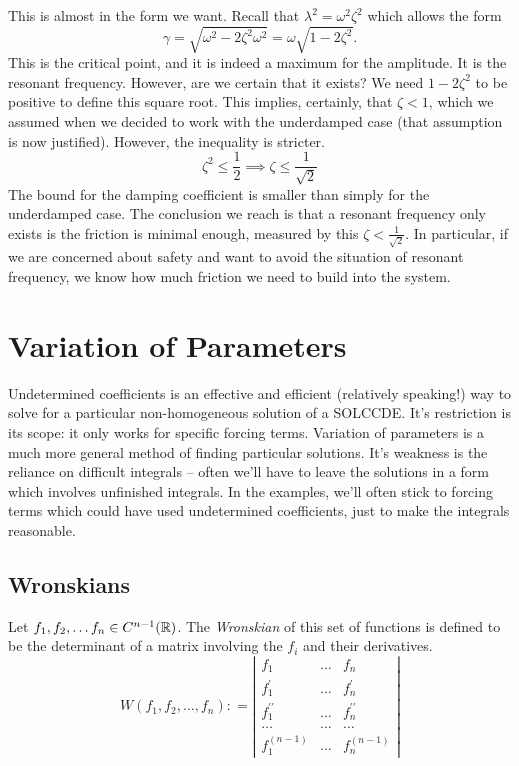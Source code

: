 \documentclass[fleqn,letterpaper]{report}
\begin{document}
This is almost in the form we want. Recall that $\lambda^2 =
\omega^2 \zeta^2$ which allows the form
\begin{equation*}
\gamma = \sqrt{\omega^2 - 2 \zeta^2 \omega^2} = \omega \sqrt{1 -
2 \zeta^2}.
\end{equation*}
This is the critical point, and it is indeed a maximum
for the amplitude. It is the resonant frequency. However, are
we certain that it exists? We need $1-2\zeta^2$ to be
positive to define this square root. This implies, certainly,
that $\zeta < 1$, which we assumed when we decided to work
with the underdamped case (that assumption is now justified).
However, the inequality is stricter. 
\begin{equation*}
\zeta^2 \leq \frac{1}{2} \implies \zeta \leq \frac{1}{\sqrt{2}}
\end{equation*}
The bound for the damping coefficient is smaller than simply
for the underdamped case. The conclusion we reach is that a
resonant frequency only exists is the friction is minimal
enough, measured by this $\zeta < \frac{1}{\sqrt{2}}$. In
particular, if we are concerned about safety and want to avoid
the situation of resonant frequency, we know how much friction
we need to build into the system. 

\section{Variation of Parameters}
\label{variation-parameters}

Undetermined coefficients is an effective and efficient
(relatively speaking!) way to solve for a particular
non-homogeneous solution of a SOLCCDE. It's restriction is
its scope: it only works for specific forcing terms.
Variation of parameters is a much more general method of
finding particular solutions. It's weakness is the reliance
on difficult integrals -- often we'll have to leave the
solutions in a form which involves unfinished integrals. In
the examples, we'll often stick to forcing terms which could
have used undetermined coefficients, just to make the
integrals reasonable.

\subsection{Wronskians}
\label{wronskians}

\begin{defn}
Let $f_1, f_2, \ldots f_n \in C^{n-1}(\mathbb{R})$. The
\emph{Wronskian} of this set of functions is defined to be the
determinant of a matrix involving the $f_i$ and their
derivatives.
\begin{equation*}
W(f_1, f_2, \ldots, f_n) : = \left| \begin{matrix} 
f_1 & \ldots & f_n \\
f^\prime_1 & \ldots & f^\prime_n \\
f^{\prime\prime}_1 & \ldots & f^{\prime\prime}_n \\
\ldots & \ldots & \ldots \\
f^{(n-1)}_1 & \ldots & f^{(n-1)}_n \end{matrix} \right|
\end{equation*}
\end{defn}
\end{document}
